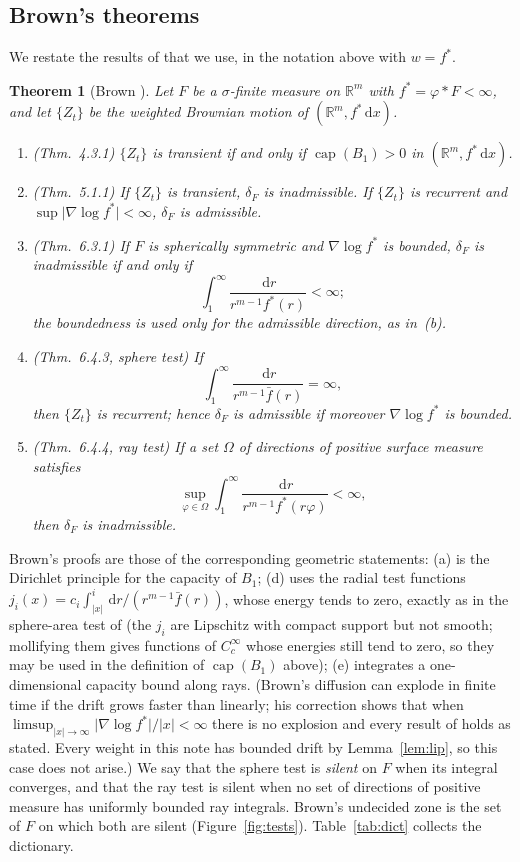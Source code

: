 \documentclass[11pt]{amsart}
\newcommand{\R}{\mathbb{R}}
\newcommand{\dd}{\,\mathrm{d}}
\newcommand{\abs}[1]{\lvert #1\rvert}
\newcommand{\fbar}{\bar f}
\DeclareMathOperator{\capa}{cap}
\theoremstyle{plain}
\newtheorem{theorem}{Theorem}[section]
\theoremstyle{definition}
\theoremstyle{remark}
\begin{document}
\subsection{Brown's theorems}
We restate the results of \cite{brown1971} that we use, in the notation above
with $w=f^*$.

\begin{theorem}[Brown \cite{brown1971}]\label{thm:brown}
Let $F$ be a $\sigma$-finite measure on $\R^m$ with $f^*=\varphi*F<\infty$, and
let $\{Z_t\}$ be the weighted Brownian motion of $(\R^m,f^*\dd x)$.
\begin{enumerate}[label=\textup{(\alph*)},leftmargin=2em,itemsep=2pt]
\item \textup{(Thm.~4.3.1)} $\{Z_t\}$ is transient if and only if
$\capa(B_1)>0$ in $(\R^m,f^*\dd x)$.
\item \textup{(Thm.~5.1.1)} If $\{Z_t\}$ is transient, $\delta_F$ is
inadmissible. If $\{Z_t\}$ is recurrent and $\sup\abs{\nabla\log f^*}<\infty$,
$\delta_F$ is admissible.
\item \textup{(Thm.~6.3.1)} If $F$ is spherically symmetric and
$\nabla\log f^*$ is bounded, $\delta_F$ is inadmissible if and only if
\[
\int_1^\infty\frac{\dd r}{r^{m-1}f^*(r)}<\infty ;
\]
the boundedness is used only for the admissible direction, as in~(b).
\item \textup{(Thm.~6.4.3, sphere test)} If
\[
\int_1^\infty\frac{\dd r}{r^{m-1}\fbar(r)}=\infty ,
\]
then $\{Z_t\}$ is recurrent; hence $\delta_F$ is admissible if moreover
$\nabla\log f^*$ is bounded.
\item \textup{(Thm.~6.4.4, ray test)} If a set $\Omega$ of directions of
positive surface measure satisfies
\[
\sup_{\varphi\in\Omega}\int_1^\infty\frac{\dd r}{r^{m-1}f^*(r\varphi)}<\infty ,
\]
then $\delta_F$ is inadmissible.
\end{enumerate}
\end{theorem}

Brown's proofs are those of the corresponding geometric statements: (a) is the
Dirichlet principle for the capacity of $B_1$; (d) uses the radial test
functions $j_i(x)=c_i\int_{\abs x}^{i}\dd r/(r^{m-1}\fbar(r))$, whose energy
tends to zero, exactly as in the sphere-area test of
\cite[Thm.~7.5]{grigoryan1999} (the $j_i$ are Lipschitz with compact support
but not smooth; mollifying them gives functions of $C_c^\infty$ whose energies
still tend to zero, so they may be used in the definition of $\capa(B_1)$
above); (e) integrates a one-dimensional capacity
bound along rays. (Brown's diffusion can explode in finite time if the drift
grows faster than linearly; his correction \cite{brown1973} shows that when
$\limsup_{\abs x\to\infty}\abs{\nabla\log f^*}/\abs x<\infty$ there is no
explosion and every result of \cite{brown1971} holds as stated. Every weight in
this note has bounded drift by Lemma~\ref{lem:lip}, so this case does not
arise.) We say that the sphere test is \emph{silent} on $F$ when its
integral converges, and that the ray test is silent when no set of directions
of positive measure has uniformly bounded ray integrals. Brown's undecided zone
is the set of $F$ on which both are silent (Figure~\ref{fig:tests}).
Table~\ref{tab:dict} collects the dictionary.
\end{document}
